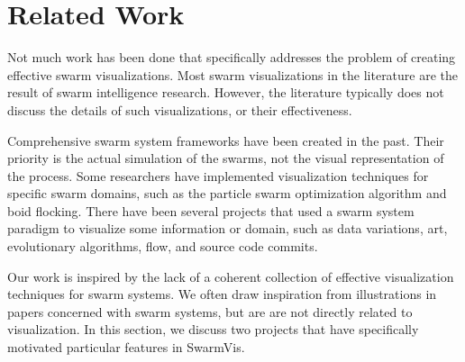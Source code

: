 \documentclass[conference]{IEEEtran}
\begin{document}
\section{Related Work}
Not much work has been done that specifically addresses the problem of creating effective swarm visualizations.
Most swarm visualizations in the literature are the result of swarm intelligence research.
However, the literature typically does not discuss the details of such visualizations, or their effectiveness. 

Comprehensive  swarm system frameworks\cite{Luke}\cite{860347} have been created in the past.
Their priority is the actual simulation of the swarms, not the visual representation of the process.
Some researchers have implemented visualization techniques for specific swarm domains,
such as the particle swarm optimization algorithm\cite{Secrest} and boid flocking\cite{reynolds1987}.
There have been several projects that used a swarm system paradigm to visualize some information or domain, such as data variations\cite{1382896}, art\cite{Boyd}, evolutionary algorithms\cite{spector2005ecb}\cite{Spector02evolutionarydynamics},
flow\cite{10.1109/TVCG.2005.87}\cite{Merzkirch}, and source code commits\cite{codeswarm:website}.

Our work is inspired by the lack of a coherent collection of effective visualization techniques for swarm systems.
We often draw inspiration from illustrations in papers concerned with swarm systems, but are are not directly related to visualization.
In this section, we discuss two projects that have specifically motivated particular features in SwarmVis.
\end{document}
